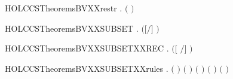 \newcommand{\HOLCCSTheoremsBVXXrelab}{\UseVerbatim{HOLCCSTheoremsBVXXrelab}}
\begin{SaveVerbatim}{HOLCCSTheoremsBVXXrestr}
\HOLTokenTurnstile{} \HOLSymConst{\HOLTokenForall{}} .  \ensuremath{(}  \ensuremath{)} \HOLSymConst{\ensuremath{=}}  
\end{SaveVerbatim}
\newcommand{\HOLCCSTheoremsBVXXrestr}{\UseVerbatim{HOLCCSTheoremsBVXXrestr}}
\begin{SaveVerbatim}{HOLCCSTheoremsBVXXSUBSET}
\HOLTokenTurnstile{} \HOLSymConst{\HOLTokenForall{}}  .  \ensuremath{(}\ensuremath{[}\ensuremath{/}\ensuremath{]} \ensuremath{)} \HOLConst{\HOLTokenSubset{}}   \HOLConst{\HOLTokenUnion{}}  
\end{SaveVerbatim}
\newcommand{\HOLCCSTheoremsBVXXSUBSET}{\UseVerbatim{HOLCCSTheoremsBVXXSUBSET}}
\begin{SaveVerbatim}{HOLCCSTheoremsBVXXSUBSETXXREC}
\HOLTokenTurnstile{} \HOLSymConst{\HOLTokenForall{}} .  \ensuremath{(}\ensuremath{[}  \ensuremath{/}\ensuremath{]} \ensuremath{)} \HOLConst{\HOLTokenSubset{}}    
\end{SaveVerbatim}
\newcommand{\HOLCCSTheoremsBVXXSUBSETXXREC}{\UseVerbatim{HOLCCSTheoremsBVXXSUBSETXXREC}}
\begin{SaveVerbatim}{HOLCCSTheoremsBVXXSUBSETXXrules}
\HOLTokenTurnstile{} \HOLSymConst{\HOLTokenForall{}}  .
         \HOLConst{\HOLTokenSubset{}}  \ensuremath{(}  \ensuremath{)} \HOLSymConst{\HOLTokenConj{}}   \HOLConst{\HOLTokenSubset{}}  \ensuremath{(} \HOLSymConst{\ensuremath{+}} \ensuremath{)} \HOLSymConst{\HOLTokenConj{}}
         \HOLConst{\HOLTokenSubset{}}  \ensuremath{(} \HOLSymConst{\ensuremath{+}} \ensuremath{)} \HOLSymConst{\HOLTokenConj{}}   \HOLConst{\HOLTokenSubset{}}  \ensuremath{(} \HOLSymConst{\ensuremath{\mid}} \ensuremath{)} \HOLSymConst{\HOLTokenConj{}}
         \HOLConst{\HOLTokenSubset{}}  \ensuremath{(} \HOLSymConst{\ensuremath{\mid}} \ensuremath{)}
\end{SaveVerbatim}

